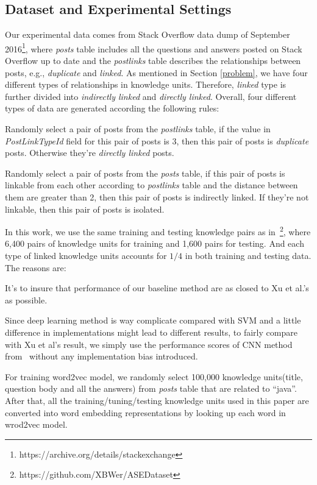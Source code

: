 \subsection{Dataset and Experimental Settings}
Our experimental data comes from Stack Overflow data dump of 
September 2016\footnote{https://archive.org/details/stackexchange},
where {\it posts} table includes all the questions and answers posted on Stack Overflow
up to date and the {\it postlinks} table describes the relationships between posts, 
e.g., {\it duplicate} and {\it linked}. As mentioned in Section
\ref{problem}, we have four different types of relationships in knowledge units.
Therefore,  {\it linked} type is further divided into {\it indirectly linked} and {\it directly linked}.
Overall, four different types of data are generated according the following rules:
\bi
\item Randomly select a pair of posts from the {\it postlinks} table, if the value
in  {\it PostLinkTypeId} field for this pair of posts is $3$, then this pair of posts is {\it duplicate} posts. 
Otherwise they're {\it directly linked} posts.

\item Randomly select a pair of posts from the {\it posts} table, if this pair of posts is linkable from each other according to
{\it postlinks} table and the distance between them are greater than 2, then this pair of posts is indirectly linked. If they're
not linkable, then this pair of posts is {isolated}.
\ei

In this work, we use the same training and testing
knowledge pairs as in~\cite{xu2016predicting}\footnote{https://github.com/XBWer/ASEDataset}, 
where 6,400 pairs of  knowledge units for training and 1,600 pairs for testing. And each type 
of linked knowledge units accounts for $1/4$ in both training and testing data. The reasons are:
\bi
\item It's to insure that  performance of our baseline method are as closed to Xu et al.'s as possible.
\item Since deep learning method is way complicate compared with SVM and a little difference in implementations
might lead to different results, to fairly compare with Xu et al's result, we simply use the  performance scores
of CNN method from~\cite{xu2016predicting} without any implementation bias introduced.
\ei

For training word2vec model, we randomly select 100,000 knowledge
 units(title, question body and all the answers) from {\it posts} table that are
 related to ``java''. After that, all the training/tuning/testing knowledge units
 used in this paper are converted into word embedding representations by looking up
 each word in wrod2vec model.
 

